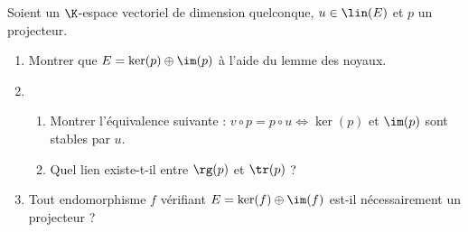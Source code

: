 \begin{enonce}
\begin{exercise}[ID={RMS135 E1410},subtitle={CCINP MP 2024},tags={},difficulty={}]
Soient un $\K$-espace vectoriel de dimension quelconque, $u \in \lin(E)$ et $p$ un projecteur.
\begin{enumerate}
  \item Montrer que $E = \ker(p) \oplus \im(p)$ à l’aide du lemme des noyaux.
  \item 
  \begin{enumerate}
    \item Montrer l’équivalence suivante : $v \circ p = p \circ u \iff \ker(p)$ et $\im(p)$ sont stables par $u$.
    \item Quel lien existe-t-il entre $\rg(p)$ et $\tr(p)$ ?
  \end{enumerate}
  \item Tout endomorphisme $f$ vérifiant $E = \ker(f) \oplus \im(f)$ est-il nécessairement un projecteur ?
\end{enumerate}
\end{exercise}
\begin{solution}
\end{solution}
\end{enonce}
